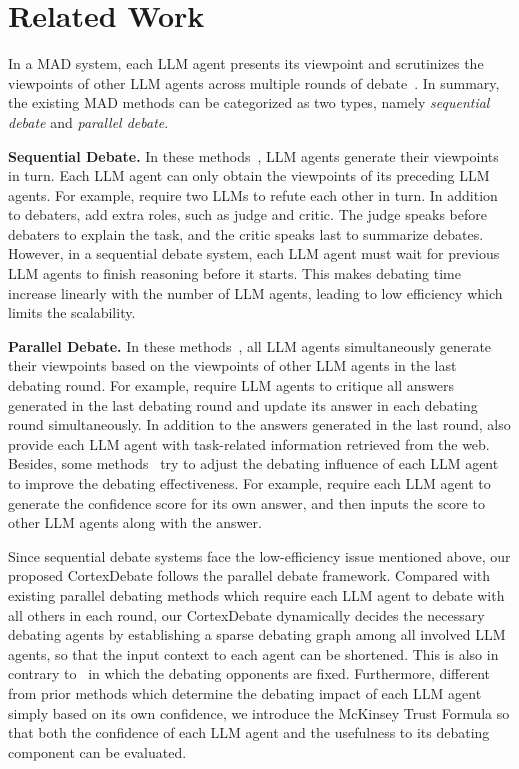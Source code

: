 \section{Related Work}
In a MAD system, each LLM agent presents its viewpoint and scrutinizes the viewpoints of other LLM agents across multiple rounds of debate~\citep{sun2024corex}. In summary, the existing MAD methods can be categorized as two types, namely \textit{sequential debate} and \textit{parallel debate}.

\textbf{Sequential Debate.} In these methods~\citep{hu2025debate, brownscalable, michael2023debate, wang2025learning, he2024agentscourt}, LLM agents generate their viewpoints in turn. Each LLM agent can only obtain the viewpoints of its preceding LLM agents. For example, \citet{liang2023encouraging} require two LLMs to refute each other in turn. In addition to debaters, \citet{guan2025mmd} add extra roles, such as judge and critic. The judge speaks before debaters to explain the task, and the critic speaks last to summarize debates. However, in a sequential debate system, each LLM agent must wait for previous LLM agents to finish reasoning before it starts. This makes debating time increase linearly with the number of LLM agents, leading to low efficiency which limits the scalability.

\textbf{Parallel Debate.} In these methods~\citep{phamlet, yin2023exchange, chern2024can, khandebating, liang2024debatrix, li2024coevol, hegazy2024diversity, zhang2024breaking}, all LLM agents simultaneously generate their viewpoints based on the viewpoints of other LLM agents in the last debating round. For example, \citet{chanchateval} require LLM agents to critique all answers generated in the last debating round and update its answer in each debating round simultaneously. In addition to the answers generated in the last round, \citet{sun2024towards} also provide each LLM agent with task-related information retrieved from the web. Besides, some methods~\citep{duan2024enhancing, yoffe2024debunc} try to adjust the debating influence of each LLM agent to improve the debating effectiveness. For example, \citet{chen2023reconcile} require each LLM agent to generate the confidence score for its own answer, and then inputs the score to other LLM agents along with the answer.

Since sequential debate systems face the low-efficiency issue mentioned above, our proposed CortexDebate follows the parallel debate framework. Compared with existing parallel debating methods which require each LLM agent to debate with all others in each round, our CortexDebate dynamically decides the necessary debating agents by establishing a sparse debating graph among all involved LLM agents, so that the input context to each agent can be shortened. This is also in contrary to~\citep{liu2024groupdebate, li2024improving} in which the debating opponents are fixed. Furthermore, different from prior methods which determine the debating impact of each LLM agent simply based on its own confidence, we introduce the McKinsey Trust Formula so that both the confidence of each LLM agent and the usefulness to its debating component can be evaluated.
